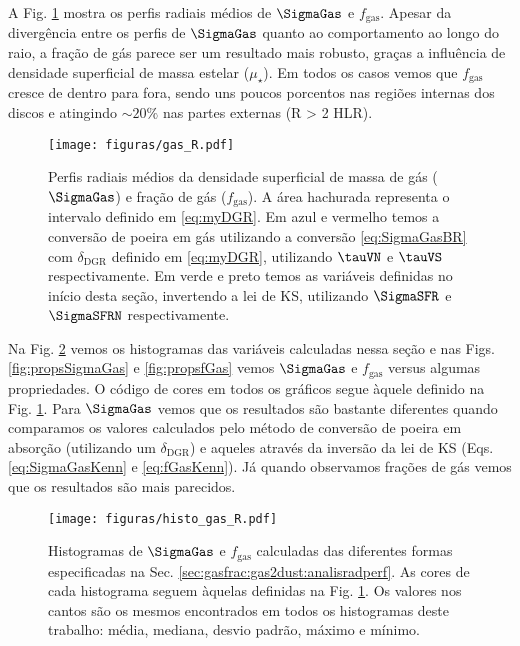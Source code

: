 A Fig. \ref{fig:propsGasR} mostra os perfis radiais médios de $\SigmaGas$ e $f_{\mathrm{gas}}$.
Apesar da divergência entre os perfis de $\SigmaGas$ quanto ao comportamento ao longo do raio, a
fração de gás parece ser um resultado mais robusto, graças a influência de densidade superficial de
massa estelar ($\mu_\star$). Em todos os casos vemos que $f_{\mathrm{gas}}$ cresce de dentro para
fora, sendo uns poucos porcentos nas regiões internas dos discos e atingindo $\sim 20\%$ nas partes
externas (R > 2 HLR).

\begin{figure}
	\centering
	\texttt{[image: figuras/gas\_R.pdf]}
	\caption[Perfis radiais de $\SigmaGas$ e $f_{\mathrm{gas}}$]
	{Perfis radiais médios da densidade superficial de massa de gás ($\SigmaGas$) e fração de gás
($f_{\mathrm{gas}}$). A área hachurada representa o intervalo definido em \eqref{eq:myDGR}. Em azul
e vermelho temos a conversão de poeira em gás utilizando a conversão \eqref{eq:SigmaGasBR} com
$\delta_{\mathrm{DGR}}$ definido em \eqref{eq:myDGR}, utilizando $\tauVN$ e $\tauVS$
respectivamente. Em verde e preto temos as variáveis definidas no início desta seção, invertendo a
lei de KS, utilizando $\SigmaSFR$ e $\SigmaSFRN$ respectivamente.}
	\label{fig:propsGasR}
\end{figure}

Na Fig. \ref{fig:histoGas} vemos os histogramas das variáveis calculadas nessa seção e nas Figs.
\ref{fig:propsSigmaGas} e \ref{fig:propsfGas} vemos $\SigmaGas$ e $f_{\mathrm{gas}}$ versus algumas
propriedades. O código de cores em todos os gráficos segue àquele definido na Fig.
\ref{fig:propsGasR}. Para $\SigmaGas$ vemos que os resultados são bastante diferentes quando
comparamos os valores calculados pelo método de conversão de poeira em absorção (utilizando um
$\delta_{\mathrm{DGR}}$) e aqueles através da inversão da lei de KS (Eqs. \ref{eq:SigmaGasKenn} e
\ref{eq:fGasKenn}). Já quando observamos frações de gás vemos que os resultados são mais
parecidos.

\begin{figure}
	\centering
	\texttt{[image: figuras/histo\_gas\_R.pdf]}
	\caption[Histogramas de $\SigmaGas$ e $f_{\mathrm{gas}}$]
	{Histogramas de $\SigmaGas$ e $f_{\mathrm{gas}}$ calculadas das diferentes formas especificadas
na Sec. \ref{sec:gasfrac:gas2dust:analisradperf}. As cores de cada histograma seguem àquelas
definidas na Fig. \ref{fig:propsGasR}. Os valores nos cantos são os mesmos encontrados em todos os
histogramas deste trabalho: média, mediana, desvio padrão, máximo e mínimo.}
	\label{fig:histoGas}
\end{figure}

